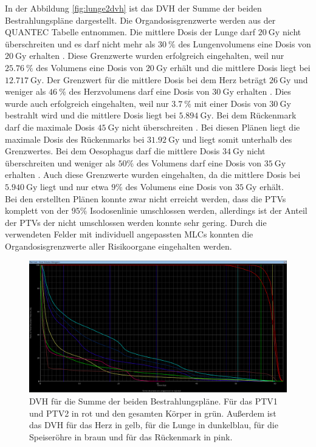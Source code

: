In der Abbildung \ref{fig:lunge2dvh} ist das DVH der Summe der beiden Bestrahlungspläne dargestellt.
Die Organdosisgrenzwerte werden aus der QUANTEC Tabelle entnommen. Die mittlere Dosis der Lunge darf $\SI{20}{\gray}$ nicht überschreiten
und es darf nicht mehr als $\SI{30}{\percent}$ des Lungenvolumens eine Dosis von $\SI{20}{\gray}$ erhalten \cite{grenz}.
Diese Grenzwerte wurden erfolgreich eingehalten, weil nur $\SI{25.76}{\percent}$ des Volumens eine Dosis von $\SI{20}{\gray}$ erhält und die mittlere Dosis
liegt bei $\SI{12.717}{\gray}$.
Der Grenzwert für die mittlere Dosis bei dem Herz beträgt $\SI{26}{\gray}$ und weniger als $\SI{46}{\percent}$ des Herzvolumens darf
eine Dosis von $\SI{30}{\gray}$ erhalten \cite{grenz}. Dies wurde auch erfolgreich eingehalten, weil nur $\SI{3.7}{\percent}$ mit einer Dosis von
$\SI{30}{\gray}$ bestrahlt wird und die mittlere Dosis liegt bei $\SI{5.894}{\gray}$.
Bei dem Rückenmark darf die maximale Dosis $\SI{45}{\gray}$ nicht überschreiten \cite{grenz}.
Bei diesen Plänen liegt die maximale Dosis des Rückenmarks bei $\SI{31.92}{\gray}$ und liegt somit unterhalb des Grenzwertes.
Bei dem Oesophagus darf die mittlere Dosis $\SI{34}{\gray}$ nicht überschreiten und weniger als $50\%$ des Volumens darf eine Dosis von $\SI{35}{\gray}$
erhalten \cite{QUANTEC}. Auch diese Grenzwerte wurden eingehalten, da die mittlere Dosis bei $\SI{5.940}{\gray}$ liegt und nur etwa $9\%$ des Volumens eine
Dosis von $\SI{35}{\gray}$ erhält. \\

Bei den erstellten Plänen konnte zwar nicht erreicht werden, dass die PTVs komplett von der $95\%$ Isodosenlinie
umschlossen werden, allerdings ist der Anteil der PTVs der nicht umschlossen werden konnte sehr gering.
Durch die verwendeten Felder mit individuell angepassten MLCs konnten die Organdosisgrenzwerte aller Risikoorgane eingehalten werden.

\begin{figure}[H]
	\centering
	\includegraphics[width=\linewidth]{Bilder/Lunge_DVHsum}
	\caption{DVH für die Summe der beiden Bestrahlungspläne. Für das PTV1 und PTV2 in rot und den gesamten Körper in grün. Außerdem ist das DVH für das Herz in gelb, für die Lunge in dunkelblau, für die Speiseröhre in braun und für das Rückenmark in pink.}
	\label{fig:lungedvhsum}
\end{figure}
